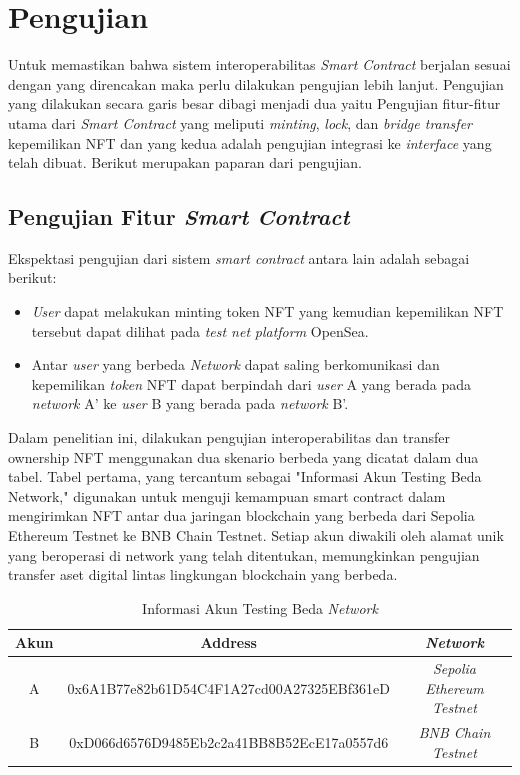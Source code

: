\section{Pengujian}
Untuk memastikan bahwa sistem interoperabilitas \emph{Smart Contract} berjalan sesuai dengan yang direncakan maka perlu dilakukan pengujian lebih lanjut. Pengujian yang dilakukan secara garis besar dibagi menjadi dua yaitu Pengujian fitur-fitur utama dari \emph{Smart Contract} yang meliputi \emph{minting}, \emph{lock}, dan \emph{bridge transfer} kepemilikan NFT dan yang kedua adalah pengujian integrasi ke \emph{interface} yang telah dibuat. Berikut merupakan paparan dari pengujian.

\subsection{Pengujian Fitur \emph{Smart Contract}}
Ekspektasi pengujian dari sistem \emph{smart contract} antara lain adalah sebagai berikut:
\begin{itemize}
    \item \emph{User} dapat melakukan minting token NFT yang kemudian kepemilikan NFT tersebut dapat dilihat pada \emph{test net} \emph{platform} OpenSea.

    \item Antar \emph{user} yang berbeda \emph{Network} dapat saling berkomunikasi dan kepemilikan \emph{token} NFT dapat berpindah dari \emph{user} A yang berada pada \emph{network} A' ke \emph{user} B yang berada pada \emph{network} B'.
\end{itemize}

Dalam penelitian ini, dilakukan pengujian interoperabilitas dan transfer ownership NFT menggunakan dua skenario berbeda yang dicatat dalam dua tabel. Tabel pertama, yang tercantum sebagai "Informasi Akun Testing Beda Network," digunakan untuk menguji kemampuan smart contract dalam mengirimkan NFT antar dua jaringan blockchain yang berbeda dari Sepolia Ethereum Testnet ke BNB Chain Testnet. Setiap akun diwakili oleh alamat unik yang beroperasi di network yang telah ditentukan, memungkinkan pengujian transfer aset digital lintas lingkungan blockchain yang berbeda. 

\begin{center}
\begin{table}[H]
      \centering
      \caption{Informasi Akun Testing Beda \emph{Network}}
      \begin{tabular}{|c|c|c|}
      \hline
      \textbf{Akun} & \textbf{Address} & \textbf{\emph{Network}}
      \\
      \hline
      A & 0x6A1B77e82b61D54C4F1A27cd00A27325EBf361eD & \emph{Sepolia Ethereum Testnet}
      \\ 
      \hline
      B & 0xD066d6576D9485Eb2c2a41BB8B52EcE17a0557d6 & \emph{BNB Chain Testnet} \\
      \hline
      \end{tabular}      
      \label{tab:akun_beda_multiple_network}
\end{table}
\end{center}


